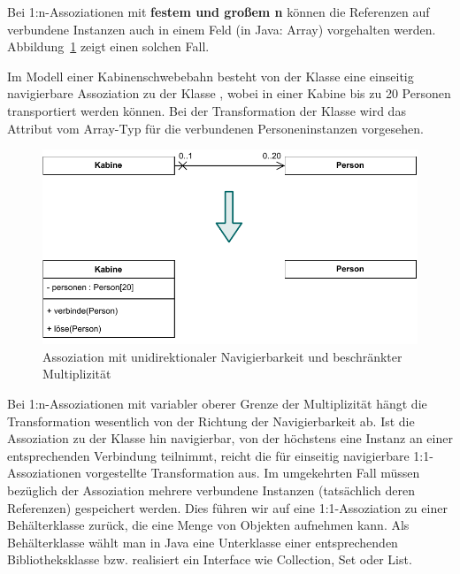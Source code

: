 Bei 1:n-Assoziationen mit \textbf{festem und großem n} können die Referenzen auf verbundene Instanzen auch in einem Feld (in Java: Array) vorgehalten werden. Abbildung~\ref{fig:transformationen_abb_d} zeigt einen solchen Fall.

\vspace{2mm} %

Im Modell einer Kabinenschwebebahn besteht von der Klasse  eine einseitig navigierbare Assoziation zu der Klasse , wobei in einer Kabine bis zu 20 Personen transportiert werden können. Bei der Transformation der Klasse  wird das Attribut  vom Array-Typ  für die verbundenen Personeninstanzen vorgesehen.

\begin{figure}[h!]
	\centering
	\includegraphics[scale=1.0]{Bilder/Kapitel-9/transformationen_abb_d.pdf}
	\vspace{\baselineskip} %
	\caption{Assoziation mit unidirektionaler Navigierbarkeit und beschränkter Multiplizität}
	\label{fig:transformationen_abb_d}
\end{figure}

\pagebreak %


\vspace{2mm} %

Bei 1:n-Assoziationen mit variabler oberer Grenze der Multiplizität hängt die Transformation wesentlich von der Richtung der Navigierbarkeit ab. Ist die Assoziation zu der Klasse hin navigierbar, von der höchstens eine Instanz an einer entsprechenden Verbindung teilnimmt, reicht die für einseitig navigierbare 1:1-Assoziationen vorgestellte Transformation aus. Im umgekehrten Fall müssen bezüglich der Assoziation mehrere verbundene Instanzen (tatsächlich deren Referenzen) gespeichert werden. Dies führen wir auf eine 1:1-Assoziation zu einer Behälterklasse zurück, die eine Menge von Objekten aufnehmen kann. Als Behälterklasse wählt man \zb in Java eine Unterklasse einer entsprechenden Bibliotheksklasse bzw. realisiert ein Interface wie Collection, Set oder List.


